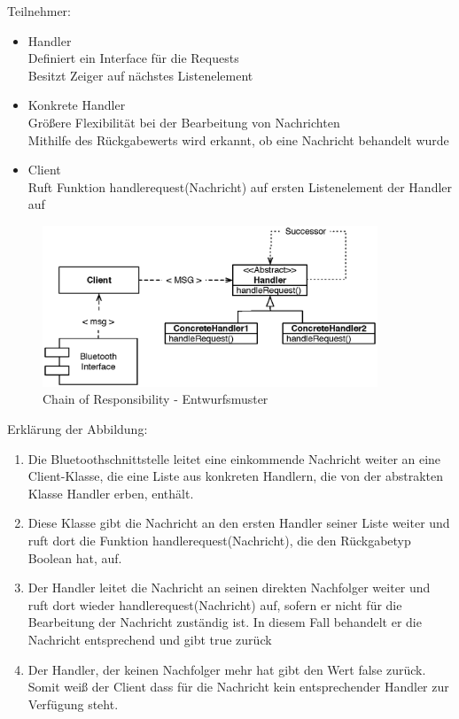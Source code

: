 \documentclass[10pt,a4paper]{article}
\begin{document}
  			Teilnehmer:
   			\begin{itemize}
  				\item Handler\\Definiert ein Interface für die Requests\\Besitzt Zeiger auf nächstes Listenelement
  				\item Konkrete Handler\\Größere Flexibilität bei der Bearbeitung von Nachrichten\\
  					Mithilfe des Rückgabewerts wird erkannt, ob eine Nachricht behandelt wurde
  				\item Client \\ Ruft Funktion handlerequest(Nachricht) auf ersten Listenelement der Handler auf
  			\end{itemize}   	
			\begin{figure}[h]
				\centering
				\includegraphics[width=10cm]{images/android_handler.eps}
  				\caption{Chain of Responsibility - Entwurfsmuster}
  			\end{figure}	
  			Erklärung der Abbildung:
   			\begin{enumerate}
  				\item Die Bluetoothschnittstelle leitet eine einkommende Nachricht weiter an eine Client-Klasse, die eine Liste aus konkreten Handlern,
  					die von der abstrakten Klasse Handler erben, enthält.
  				\item Diese Klasse gibt die Nachricht an den ersten Handler seiner Liste weiter und ruft dort die Funktion handlerequest(Nachricht),
  					die den Rückgabetyp Boolean hat, auf.
  				\item Der Handler leitet die Nachricht an seinen direkten Nachfolger weiter und ruft dort wieder handlerequest(Nachricht) auf, sofern
  					er nicht für die Bearbeitung der Nachricht zuständig ist. In diesem Fall behandelt er die Nachricht entsprechend und gibt true zurück
  				\item Der Handler, der keinen Nachfolger mehr hat gibt den Wert false zurück. Somit weiß der Client dass für die Nachricht kein
  					entsprechender Handler zur Verfügung steht.  					
  			\end{enumerate}   
\end{document}
